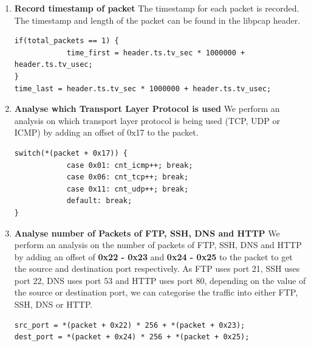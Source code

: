 \documentclass[a4paper,11pt]{article}
\begin{document}
\begin{enumerate}
\item \textbf{Record timestamp of packet}
\newline The timestamp for each packet is recorded. The timestamp and length of the packet can be found in the libpcap header.
\begin{mdframed}[backgroundcolor=light-gray, roundcorner=30pt,leftmargin=1, rightmargin=1, innerleftmargin=5, innertopmargin=-3,innerbottommargin=5, outerlinewidth=1, linecolor=light-gray]
\begin{lstlisting}
if(total_packets == 1) {
			time_first = header.ts.tv_sec * 1000000 + header.ts.tv_usec;
}
time_last = header.ts.tv_sec * 1000000 + header.ts.tv_usec;
\end{lstlisting}
\end{mdframed}
\item \textbf{Analyse which Transport Layer Protocol is used}
\newline We perform an analysis on which transport layer protocol is being used (TCP, UDP or ICMP) by adding an offset of 0x17 to the packet.
\begin{mdframed}[backgroundcolor=light-gray, roundcorner=30pt,leftmargin=1, rightmargin=1, innerleftmargin=5, innertopmargin=-3,innerbottommargin=5, outerlinewidth=1, linecolor=light-gray]
\begin{lstlisting}
switch(*(packet + 0x17)) {
			case 0x01: cnt_icmp++; break;
			case 0x06: cnt_tcp++; break;
			case 0x11: cnt_udp++; break;
			default: break;
}
\end{lstlisting}
\end{mdframed}
\item \textbf{Analyse number of Packets of FTP, SSH, DNS and HTTP}
We perform an analysis on the number of packets of FTP, SSH, DNS and HTTP by adding an offset of \textbf{0x22 - 0x23} and \textbf{0x24 - 0x25} to the packet to get the source and destination port respectively. As FTP uses port 21, SSH uses port 22, DNS uses port 53 and HTTP uses port 80,  depending on the value of the source or destination port, we can categorise the traffic into either FTP, SSH, DNS or HTTP.
\begin{mdframed}[backgroundcolor=light-gray, roundcorner=30pt,leftmargin=1, rightmargin=1, innerleftmargin=5, innertopmargin=-3,innerbottommargin=5, outerlinewidth=1, linecolor=light-gray]
\begin{lstlisting}
src_port = *(packet + 0x22) * 256 + *(packet + 0x23);
dest_port = *(packet + 0x24) * 256 + *(packet + 0x25);

\end{lstlisting}
\end{mdframed}
\end{enumerate}
\end{document}
